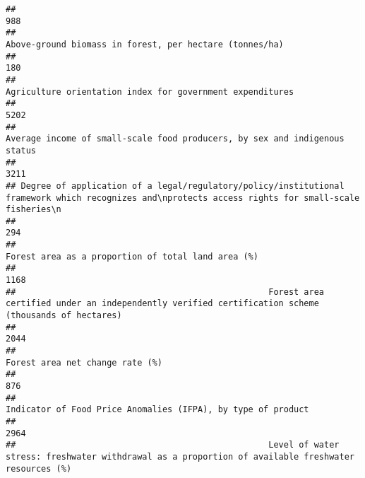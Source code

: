 \documentclass[]{article}
\begin{document}
\begin{verbatim}
##                                                                                                                                                 988 
##                                                                                             Above-ground biomass in forest, per hectare (tonnes/ha) 
##                                                                                                                                                 180 
##                                                                                           Agriculture orientation index for government expenditures 
##                                                                                                                                                5202 
##                                                                          Average income of small-scale food producers, by sex and indigenous status 
##                                                                                                                                                3211 
## Degree of application of a legal/regulatory/policy/institutional framework which recognizes and\nprotects access rights for small-scale fisheries\n 
##                                                                                                                                                 294 
##                                                                                                  Forest area as a proportion of total land area (%) 
##                                                                                                                                                1168 
##                                                  Forest area certified under an independently verified certification scheme (thousands of hectares) 
##                                                                                                                                                2044 
##                                                                                                                     Forest area net change rate (%) 
##                                                                                                                                                 876 
##                                                                                        Indicator of Food Price Anomalies (IFPA), by type of product 
##                                                                                                                                                2964 
##                                                  Level of water stress: freshwater withdrawal as a proportion of available freshwater resources (%) 

\end{verbatim}
\end{document}
